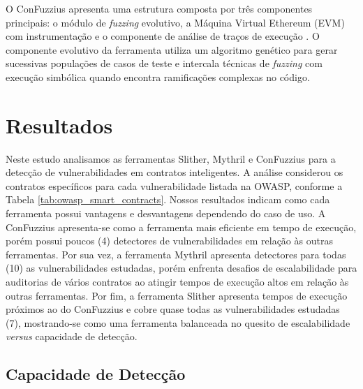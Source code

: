 \documentclass[12pt]{article}
\begin{document}
O ConFuzzius apresenta uma estrutura composta por três componentes principais: o módulo de \textit{fuzzing} evolutivo, a Máquina Virtual Ethereum (EVM) com instrumentação e o componente de análise de traços de execução \cite{9581164}. O componente evolutivo da ferramenta utiliza um algoritmo genético para gerar sucessivas populações de casos de teste e intercala técnicas de \textit{fuzzing} com execução simbólica quando encontra ramificações complexas no código.


\section{Resultados}\label{sec:results}

Neste estudo analisamos as ferramentas Slither, Mythril e ConFuzzius para a detecção de vulnerabilidades em contratos inteligentes. A análise considerou os contratos específicos para cada vulnerabilidade listada na OWASP, conforme a Tabela \ref{tab:owasp_smart_contracts}. Nossos resultados indicam como cada ferramenta possui vantagens e desvantagens dependendo do caso de uso. A ConFuzzius apresenta-se como a ferramenta mais eficiente em tempo de execução, porém possui poucos (4) detectores de vulnerabilidades em relação às outras ferramentas. Por sua vez, a ferramenta Mythril apresenta detectores para todas (10) as vulnerabilidades estudadas, porém enfrenta desafios de escalabilidade para auditorias de vários contratos ao atingir tempos de execução altos em relação às outras ferramentas. Por fim, a ferramenta Slither apresenta tempos de execução próximos ao do ConFuzzius e cobre quase todas as vulnerabilidades estudadas (7), mostrando-se como uma ferramenta balanceada no quesito de escalabilidade \textit{versus} capacidade de detecção.

\subsection{Capacidade de Detecção}\label{subsec:detectionanalysis}

\end{document}
